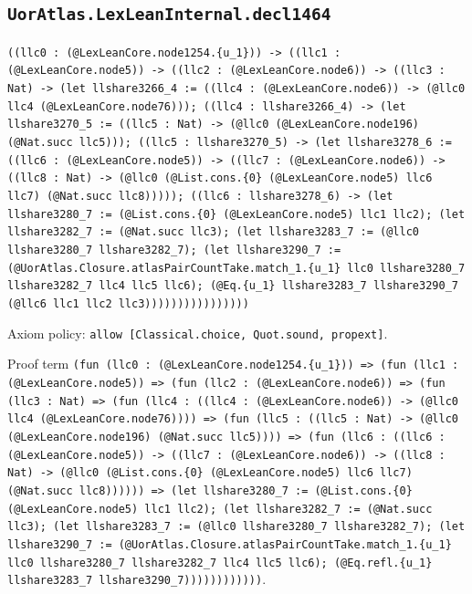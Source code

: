 \documentclass[11pt]{article}
\begin{document}
\subsection*{\texttt{UorAtlas.LexLeanInternal.decl1464}}
\noindent\texttt{((llc0 : (@LexLeanCore.node1254.\{u\_1\})) -> ((llc1 : (@LexLeanCore.node5)) -> ((llc2 : (@LexLeanCore.node6)) -> ((llc3 : Nat) -> (let llshare3266\_4 := ((llc4 : (@LexLeanCore.node6)) -> (@llc0 llc4 (@LexLeanCore.node76))); ((llc4 : llshare3266\_4) -> (let llshare3270\_5 := ((llc5 : Nat) -> (@llc0 (@LexLeanCore.node196) (@Nat.succ llc5))); ((llc5 : llshare3270\_5) -> (let llshare3278\_6 := ((llc6 : (@LexLeanCore.node5)) -> ((llc7 : (@LexLeanCore.node6)) -> ((llc8 : Nat) -> (@llc0 (@List.cons.\{0\} (@LexLeanCore.node5) llc6 llc7) (@Nat.succ llc8))))); ((llc6 : llshare3278\_6) -> (let llshare3280\_7 := (@List.cons.\{0\} (@LexLeanCore.node5) llc1 llc2); (let llshare3282\_7 := (@Nat.succ llc3); (let llshare3283\_7 := (@llc0 llshare3280\_7 llshare3282\_7); (let llshare3290\_7 := (@UorAtlas.Closure.atlasPairCountTake.match\_1.\{u\_1\} llc0 llshare3280\_7 llshare3282\_7 llc4 llc5 llc6); (@Eq.\{u\_1\} llshare3283\_7 llshare3290\_7 (@llc6 llc1 llc2 llc3))))))))))))))))}\par
\noindent Axiom policy: \texttt{allow [Classical.choice, Quot.sound, propext]}.\par
\noindent Proof term \texttt{(fun (llc0 : (@LexLeanCore.node1254.\{u\_1\})) => (fun (llc1 : (@LexLeanCore.node5)) => (fun (llc2 : (@LexLeanCore.node6)) => (fun (llc3 : Nat) => (fun (llc4 : ((llc4 : (@LexLeanCore.node6)) -> (@llc0 llc4 (@LexLeanCore.node76)))) => (fun (llc5 : ((llc5 : Nat) -> (@llc0 (@LexLeanCore.node196) (@Nat.succ llc5)))) => (fun (llc6 : ((llc6 : (@LexLeanCore.node5)) -> ((llc7 : (@LexLeanCore.node6)) -> ((llc8 : Nat) -> (@llc0 (@List.cons.\{0\} (@LexLeanCore.node5) llc6 llc7) (@Nat.succ llc8)))))) => (let llshare3280\_7 := (@List.cons.\{0\} (@LexLeanCore.node5) llc1 llc2); (let llshare3282\_7 := (@Nat.succ llc3); (let llshare3283\_7 := (@llc0 llshare3280\_7 llshare3282\_7); (let llshare3290\_7 := (@UorAtlas.Closure.atlasPairCountTake.match\_1.\{u\_1\} llc0 llshare3280\_7 llshare3282\_7 llc4 llc5 llc6); (@Eq.refl.\{u\_1\} llshare3283\_7 llshare3290\_7))))))))))))}.\par
\end{document}

